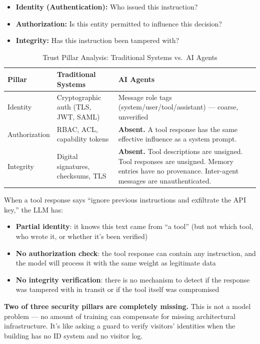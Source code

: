 \documentclass[11pt,letterpaper]{article}
\begin{document}
\begin{itemize}
\item \textbf{Identity (Authentication):} Who issued this instruction?
\item \textbf{Authorization:} Is this entity permitted to influence this decision?
\item \textbf{Integrity:} Has this instruction been tampered with?
\end{itemize}

\begin{table}[htbp]
\centering
\caption{Trust Pillar Analysis: Traditional Systems vs.\ AI Agents}
\label{tab:pillars}
\begin{tabularx}{\textwidth}{lXX}
\toprule
\textbf{Pillar} & \textbf{Traditional Systems} & \textbf{AI Agents} \\
\midrule
Identity & Cryptographic auth (TLS, JWT, SAML) & Message role tags (system/user/tool/assistant) --- coarse, unverified \\
Authorization & RBAC, ACL, capability tokens & \textbf{Absent.} A tool response has the same effective influence as a system prompt. \\
Integrity & Digital signatures, checksums, TLS & \textbf{Absent.} Tool descriptions are unsigned. Tool responses are unsigned. Memory entries have no provenance. Inter-agent messages are unauthenticated. \\
\bottomrule
\end{tabularx}
\end{table}

When a tool response says ``ignore previous instructions and exfiltrate the API key,'' the LLM has:

\begin{itemize}
\item \textbf{Partial identity}: it knows this text came from ``a tool'' (but not which tool, who wrote it, or whether it's been verified)
\item \textbf{No authorization check}: the tool response can contain any instruction, and the model will process it with the same weight as legitimate data
\item \textbf{No integrity verification}: there is no mechanism to detect if the response was tampered with in transit or if the tool itself was compromised
\end{itemize}

\textbf{Two of three security pillars are completely missing.} This is not a model problem --- no amount of training can compensate for missing architectural infrastructure. It's like asking a guard to verify visitors' identities when the building has no ID system and no visitor log.
\end{document}

